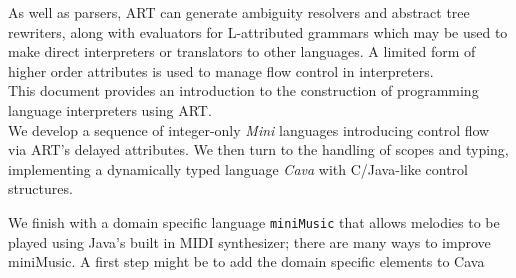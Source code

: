 {\sf
\noindent
As well as parsers, ART can generate ambiguity resolvers and abstract tree rewriters, along with evaluators for L-attributed grammars which may be used to make direct interpreters or translators to other languages. A limited form of higher order attributes is used to manage flow control in interpreters.\\[1ex]

\noindent
This document provides an introduction to the construction of programming language interpreters using ART.\\[1ex]

\noindent We develop a sequence of integer-only {\em Mini} languages introducing control flow via ART's delayed attributes.
We then turn to the handling of scopes and typing, implementing a dynamically typed language {\em Cava} with C/Java-like control structures. 

\noindent We finish with a domain specific language {\tt miniMusic} that allows melodies to be played using Java's built in MIDI synthesizer; there are many ways to improve miniMusic. A first step might be to add the domain specific elements to Cava\\[1ex]

}

\clearpage
\setcounter{page}{1}  \tableofcontents
\cleardoublepage
